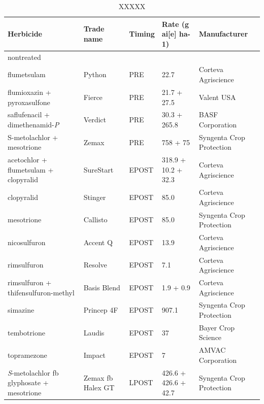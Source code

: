 \documentclass[agriculture,article,submit,moreauthors,pdftex]{mdpi}
\begin{document}
\begin{table}[ht!]
\caption{XXXXX}
\label{tab:my-table}
\begin{tabular}{@{}lllll@{}}
\toprule
\textbf{Herbicide}   & \textbf{Trade name}  & \textbf{Timing}   & \textbf{Rate (g ai{[}e{]} ha-1)} & \textbf{Manufacturer}             \\ \midrule
nontreated                                           &                  &          &                         &                          \\
flumetsulam                                          & Python           & PRE      & 22.7                    & Corteva Agriscience      \\
flumioxazin + pyroxasulfone                          & Fierce           & PRE      & 21.7 + 27.5             & Valent USA               \\
saflufenacil + dimethenamid-\textit{P}               & Verdict          & PRE      & 30.3 + 265.8            & BASF Corporation         \\
S-metolachlor + mesotrione                           & Zemax            & PRE      & 758 + 75                & Syngenta Crop Protection \\
acetochlor + flumetsulam + clopyralid                & SureStart        & EPOST    & 318.9 + 10.2 + 32.3     & Corteva Agriscience      \\
clopyralid                                           & Stinger          & EPOST    & 85.0                    & Corteva Agriscience      \\
mesotrione                                           & Callisto         & EPOST    & 85.0                    & Syngenta Crop Protection \\
nicosulfuron                                         & Accent Q         & EPOST    & 13.9                    & Corteva Agriscience      \\
rimsulfuron                                          & Resolve          & EPOST    & 7.1                     & Corteva Agriscience      \\
rimsulfuron + thifensulfuron-methyl                  & Basis Blend      & EPOST    & 1.9 + 0.9               & Corteva Agriscience      \\
simazine                                             & Princep 4F       & EPOST    & 907.1                   & Syngenta Crop Protection \\
tembotrione                                          & Laudis           & EPOST    & 37                      & Bayer Crop Science       \\
topramezone                                          & Impact           & EPOST    & 7                       & AMVAC Corporation        \\
\textit{S}-metolachlor fb glyphosate + mesotrione              & Zemax fb Halex GT & LPOST    & 426.6 + 426.6 + 42.7    & Syngenta Crop Protection \\ \bottomrule
\end{tabular}
\end{table}
\end{document}
